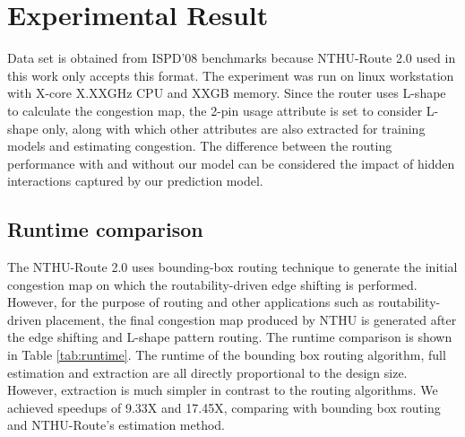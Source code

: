 \section{Experimental Result}
\label{sec:result}
Data set is obtained from ISPD'08 benchmarks because NTHU-Route 2.0 used in this work only accepts this format. The experiment was run on linux workstation with X-core X.XXGHz CPU and XXGB memory. Since the router uses L-shape to calculate the congestion map, the 2-pin usage attribute is set to consider L-shape only, along with which other attributes are also extracted for training models and estimating congestion. The difference between the routing performance with and without our model can be considered the impact of hidden interactions captured by our prediction model.

\subsection{Runtime comparison}
The NTHU-Route 2.0 uses bounding-box routing technique to generate the initial congestion map on which the routability-driven edge shifting is performed. However, for the purpose of routing and other applications such as routability-driven placement, the final congestion map produced by NTHU is generated after the edge shifting and L-shape pattern routing. The runtime comparison is shown in Table \ref{tab:runtime}. The runtime of the bounding box routing algorithm, full estimation and extraction are all directly proportional to the design size. However, extraction is much simpler in contrast to the routing algorithms. We achieved speedups of 9.33X and 17.45X, comparing with bounding box routing and NTHU-Route's estimation method.
